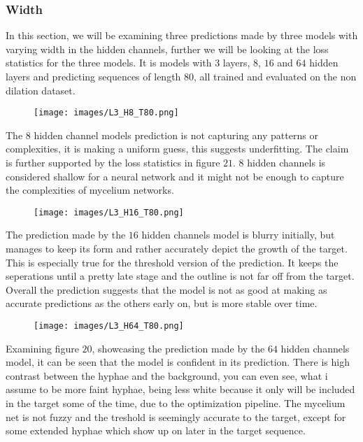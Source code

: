 \documentclass[a4paper,12pt]{article}
\begin{document}
\subsubsection{Width}
In this section, we will be examining three predictions made by three models with varying width in the hidden channels, further we will be looking at the loss statistics for the three models. It is models with $3$ layers, $8$, $16$ and $64$ hidden layers and predicting sequences of length $80$, all trained and evaluated on the non dilation dataset.
\begin{figure}[H]
  \centering
  \texttt{[image: images/L3\_H8\_T80.png]}
  \caption{} %
  \label{fig:n21}
\end{figure}
The $8$ hidden channel models prediction is not capturing any patterns or complexities, it is making a uniform guess, this suggests underfitting. The claim is further supported by the loss statistics in figure $21$. $8$ hidden channels is considered shallow for a neural network and it might not be enough to capture the complexities of mycelium networks.
\begin{figure}[H]
  \centering
  \texttt{[image: images/L3\_H16\_T80.png]}
  \caption{} %
  \label{fig:n22}
\end{figure}
The prediction made by the $16$ hidden channels model is blurry initially, but manages to keep its form and rather accurately depict the growth of the target. This is especially true for the threshold version of the prediction. It keeps the seperations until a pretty late stage and the outline is not far off from the target. Overall the prediction suggests that the model is not as good at making as accurate predictions as the others early on, but is more stable over time.
\begin{figure}[H]
  \centering
  \texttt{[image: images/L3\_H64\_T80.png]}
  \caption{} %
  \label{fig:n23}
\end{figure}
Examining figure $20$, showcasing the prediction made by the $64$ hidden channels model, it can be seen that the model is confident in its prediction. There is high contrast between the hyphae and the background, you can even see, what i assume to be more faint hyphae, being less white because it only will be included in the target some of the time, due to the optimization pipeline. The mycelium net is not fuzzy and the treshold is seemingly accurate to the target, except for some extended hyphae which show up on later in the target sequence.
\end{document}
